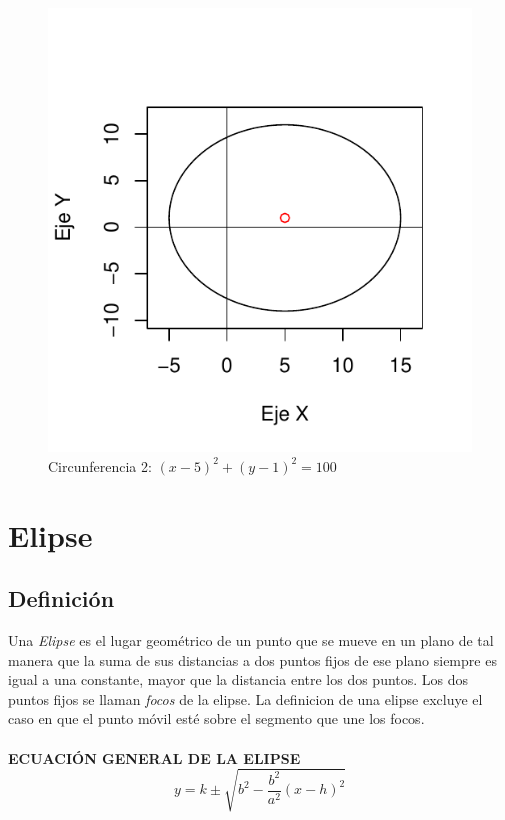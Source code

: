 \documentclass[12pt,a4paper]{article}
\begin{document}
\begin{figure}
\centering
\includegraphics[scale=.8]{CIR2}
\caption{Circunferencia 2: $ (x-5)^2 + (y-1)^2 = 100$}
\label{fig:circunferencia2}
\end{figure}
\newpage
\section{Elipse} \label{sec:Elip}
\subsection{Definici\'{o}n} \label{subsec:DefE}
Una \emph{Elipse} es el lugar geométrico de un punto que se mueve en un plano de tal manera que la suma de sus distancias a dos puntos fijos de ese plano siempre es igual a una constante, mayor que la distancia entre los dos puntos. Los dos puntos fijos se llaman \emph{focos} de la elipse. La definicion de una elipse excluye el caso en que el punto móvil esté sobre el segmento que une los focos.\cite{geometria}\\ \\

\textbf{ECUACIÓN GENERAL DE LA ELIPSE}
\begin{equation}
y = k \pm \sqrt{b^2 - \frac{b^2}{a^2}(x - h)^2} \label{eq:elipse}
\end{equation}
\end{document}
